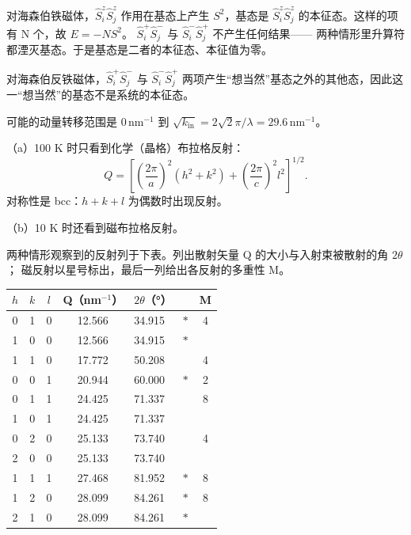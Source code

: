 对海森伯铁磁体，$\hat{S}_i^z\hat{S}_j^z$ 作用在基态上产生 $S^{2}$，基态是
$\hat{S}_i^z\hat{S}_j^z$ 的本征态。这样的项有 N 个，故 $E=-NS^{2}$。
$\hat{S}_i^{+}\hat{S}_j^{-}$ 与 $\hat{S}_i^{-}\hat{S}_j^{+}$ 不产生任何结果——
两种情形里升算符都湮灭基态。于是基态是二者的本征态、本征值为零。

对海森伯反铁磁体，$\hat{S}_i^{+}\hat{S}_j^{-}$ 与 $\hat{S}_i^{-}\hat{S}_j^{+}$
两项产生“想当然”基态之外的其他态，因此这一“想当然”的基态不是系统的本征态。

 可能的动量转移范围是 $0\,\mathrm{nm^{-1}}$ 到
$\sqrt{k_{\mathrm{in}}}=2\sqrt{2}\pi/\lambda=29.6\,\mathrm{nm^{-1}}$。

（a）100 K 时只看到化学（晶格）布拉格反射：
\begin{equation*}
Q = \left[\left(\frac{2\pi}{a}\right)^{2}(h^{2}+k^{2}) + \left(\frac{2\pi}{c}\right)^{2}l^{2}\right]^{1/2}.\tag{F.56}
\end{equation*}
对称性是 bcc：$h+k+l$ 为偶数时出现反射。

（b）10 K 时还看到磁布拉格反射。

两种情形观察到的反射列于下表。列出散射矢量 Q 的大小与入射束被散射的角 $2\theta$；
磁反射以星号标出，最后一列给出各反射的多重性 M。

\begin{table}
\centering
\begin{small}
\begin{tabular}{cccclcc}
\toprule
$h$ & $k$ & $l$ & Q（nm$^{-1}$） & $2\theta$（°） & & M\\
\midrule
0 & 1 & 0 & 12.566 & 34.915 & $*$ & 4\\
1 & 0 & 0 & 12.566 & 34.915 & $*$ & \\
1 & 1 & 0 & 17.772 & 50.208 & & 4\\
0 & 0 & 1 & 20.944 & 60.000 & $*$ & 2\\
0 & 1 & 1 & 24.425 & 71.337 & & 8\\
1 & 0 & 1 & 24.425 & 71.337 & & \\
0 & 2 & 0 & 25.133 & 73.740 & & 4\\
2 & 0 & 0 & 25.133 & 73.740 & & \\
1 & 1 & 1 & 27.468 & 81.952 & $*$ & 8\\
1 & 2 & 0 & 28.099 & 84.261 & $*$ & 8\\
2 & 1 & 0 & 28.099 & 84.261 & $*$ & \\
\bottomrule
\end{tabular}
\end{small}
\end{table}

